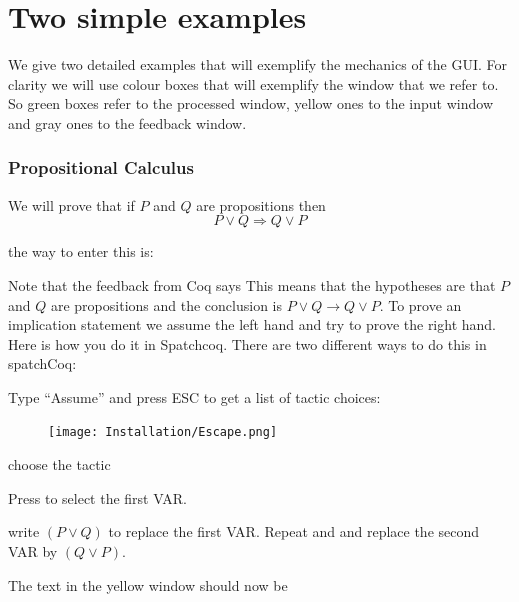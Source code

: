 
\chapter{Two simple examples}\label{ch:examples}
We give two detailed examples that will exemplify the mechanics of the GUI. For clarity we will use colour boxes that will exemplify the window that we refer to. So green boxes refer to the processed window, yellow ones to the input window and gray ones to the feedback window.

\subsection{Propositional Calculus}

We will prove that if $P$ and $Q$ are propositions then $$P\lor Q \Rightarrow Q\lor P$$

the way to enter this is:

 
 Note that  the feedback from Coq says 
This means that the hypotheses are that $P$ and $Q$ are propositions and the conclusion is $ P \lor Q \rightarrow Q \lor P$. To prove an implication  statement we assume the left hand and try to prove the right hand. Here is how you do it in Spatchcoq. There are two different ways to do this in spatchCoq:

Type ``Assume'' and press ESC to get a list of tactic choices:

\begin{figure}[h!]
\texttt{[image: Installation/Escape.png]}


\label{tactics}
\end{figure}

choose the tactic

\noindent
{}

Press \VAR to select the first VAR.

write $( P \lor Q )$ to replace the first VAR. Repeat \VAR and and replace the second VAR by $(Q \lor P)$.



The text in the yellow window should now be 

\noindent
{}

